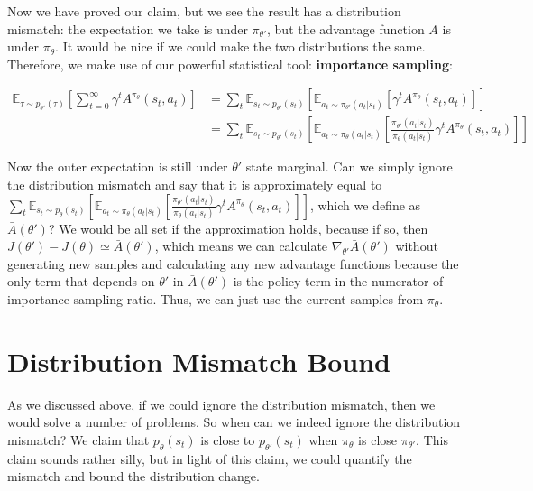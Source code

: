 Now we have proved our claim, but we see the result has a distribution mismatch: the expectation we take is under $\pi_{\theta'}$, but the advantage function $A$ is under $\pi_\theta$. It would be nice if we could make the two distributions the same. Therefore, we make use of our powerful statistical tool: \textbf{importance sampling}:

\begin{align*}
\mathbb{E}_{\tau\sim p_{\theta'}(\tau)}\left[\sum_{t=0}^\infty\gamma^tA^{\pi_\theta}(s_t,a_t)\right] &= \sum_t\mathbb{E}_{s_t\sim p_{\theta'}(s_t)}\left[\mathbb{E}_{a_t\sim \pi_{\theta'}(a_t|s_t)}\left[\gamma^t A^{\pi_\theta}(s_t,a_t)\right]\right]\\
&=\sum_t\mathbb{E}_{s_t\sim p_{\theta'}(s_t)}\left[\mathbb{E}_{a_t\sim \pi_{\theta}(a_t|s_t)}\left[\frac{\pi_{\theta'}(a_t|s_t)}{\pi_\theta(a_t|s_t)}\gamma^t A^{\pi_\theta}(s_t,a_t)\right]\right]
\end{align*}

Now the outer expectation is still under $\theta'$ state marginal. Can we simply ignore the distribution mismatch and say that it is approximately equal to $\sum_t\mathbb{E}_{s_t\sim p_{\theta}(s_t)}\left[\mathbb{E}_{a_t\sim \pi_{\theta}(a_t|s_t)}\left[\frac{\pi_{\theta'}(a_t|s_t)}{\pi_\theta(a_t|s_t)}\gamma^t A^{\pi_\theta}(s_t,a_t)\right]\right]$, which we define as $\bar{A}(\theta')$? We would be all set if the approximation holds, because if so, then $J(\theta') - J(\theta) \simeq \bar{A}(\theta')$, which means we can calculate $\nabla_{\theta'}\bar{A}(\theta')$ without generating new samples and calculating any new advantage functions because the only term that depends on $\theta'$ in $\bar{A}(\theta')$ is the policy term in the numerator of importance sampling ratio. Thus, we can just use the current samples from $\pi_\theta$.

\section{Distribution Mismatch Bound}
As we discussed above, if we could ignore the distribution mismatch, then we would solve a number of problems. So when can we indeed ignore the distribution mismatch? We claim that $p_\theta(s_t)$ is close to $p_{\theta'}(s_t)$ when $\pi_\theta$ is close $\pi_{\theta'}$. This claim sounds rather silly, but in light of this claim, we could quantify the mismatch and bound the distribution change.

